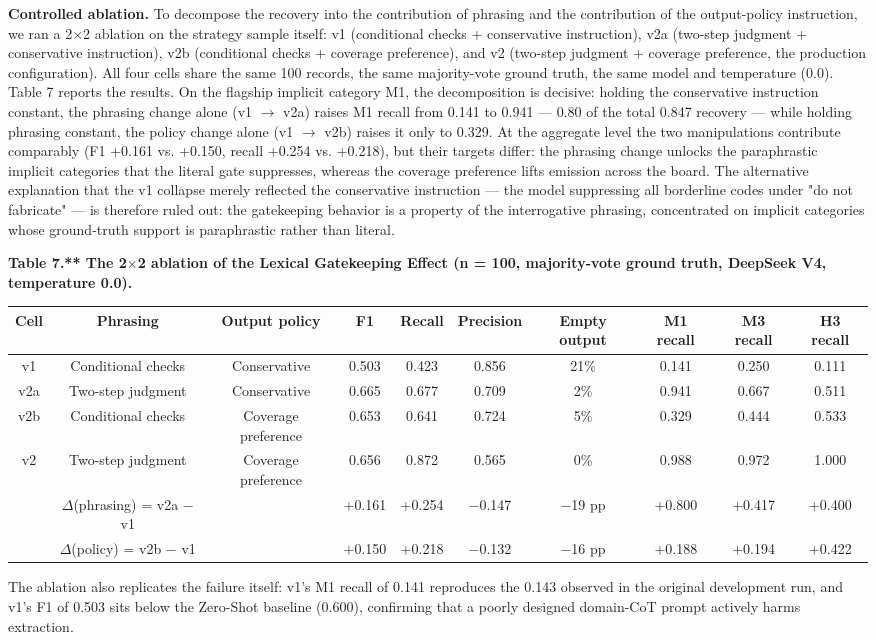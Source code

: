 \documentclass[11pt]{article}
\begin{document}
\textbf{Controlled ablation.} To decompose the recovery into the contribution of phrasing and the contribution of the output-policy instruction, we ran a 2$\times$2 ablation on the strategy sample itself: v1 (conditional checks + conservative instruction), v2a (two-step judgment + conservative instruction), v2b (conditional checks + coverage preference), and v2 (two-step judgment + coverage preference, the production configuration). All four cells share the same 100 records, the same majority-vote ground truth, the same model and temperature (0.0). Table 7 reports the results. On the flagship implicit category M1, the decomposition is decisive: holding the conservative instruction constant, the phrasing change alone (v1 $\rightarrow$ v2a) raises M1 recall from 0.141 to 0.941 --- 0.80 of the total 0.847 recovery --- while holding phrasing constant, the policy change alone (v1 $\rightarrow$ v2b) raises it only to 0.329. At the aggregate level the two manipulations contribute comparably (F1 +0.161 vs. +0.150, recall +0.254 vs. +0.218), but their targets differ: the phrasing change unlocks the paraphrastic implicit categories that the literal gate suppresses, whereas the coverage preference lifts emission across the board. The alternative explanation that the v1 collapse merely reflected the conservative instruction --- the model suppressing all borderline codes under "do not fabricate" --- is therefore ruled out: the gatekeeping behavior is a property of the interrogative phrasing, concentrated on implicit categories whose ground-truth support is paraphrastic rather than literal.

\textbf{Table 7.** The 2$\times$2 ablation of the Lexical Gatekeeping Effect (n = 100, majority-vote ground truth, DeepSeek V4, temperature 0.0).}
\begin{table}[htbp]
\centering
\small
\begin{tabular}{cccccccccc}
\hline
Cell & Phrasing & Output policy & F1 & Recall & Precision & Empty output & M1 recall & M3 recall & H3 recall \\
\hline
v1 & Conditional checks & Conservative & 0.503 & 0.423 & 0.856 & 21\% & 0.141 & 0.250 & 0.111 \\
v2a & Two-step judgment & Conservative & 0.665 & 0.677 & 0.709 & 2\% & 0.941 & 0.667 & 0.511 \\
v2b & Conditional checks & Coverage preference & 0.653 & 0.641 & 0.724 & 5\% & 0.329 & 0.444 & 0.533 \\
v2 & Two-step judgment & Coverage preference & 0.656 & 0.872 & 0.565 & 0\% & 0.988 & 0.972 & 1.000 \\
 & $\Delta$(phrasing) = v2a − v1 &  & +0.161 & +0.254 & −0.147 & −19 pp & +0.800 & +0.417 & +0.400 \\
 & $\Delta$(policy) = v2b − v1 &  & +0.150 & +0.218 & −0.132 & −16 pp & +0.188 & +0.194 & +0.422 \\
\hline
\end{tabular}
\end{table}
The ablation also replicates the failure itself: v1's M1 recall of 0.141 reproduces the 0.143 observed in the original development run, and v1's F1 of 0.503 sits below the Zero-Shot baseline (0.600), confirming that a poorly designed domain-CoT prompt actively harms extraction.
\end{document}
